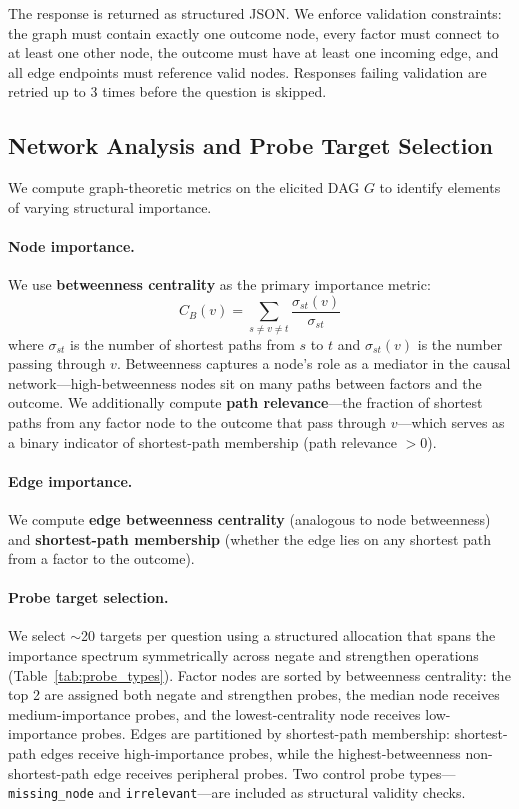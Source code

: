 \documentclass[11pt]{article}
\begin{document}
The response is returned as structured JSON. We enforce validation constraints: the graph must contain exactly one outcome node, every factor must connect to at least one other node, the outcome must have at least one incoming edge, and all edge endpoints must reference valid nodes. Responses failing validation are retried up to 3 times before the question is skipped.

\subsection{Network Analysis and Probe Target Selection}
\label{sec:network}

We compute graph-theoretic metrics on the elicited DAG $G$ to identify elements of varying structural importance.

\paragraph{Node importance.} We use \textbf{betweenness centrality} as the primary importance metric:
\begin{equation}
    C_B(v) = \sum_{s \neq v \neq t} \frac{\sigma_{st}(v)}{\sigma_{st}}
\end{equation}
where $\sigma_{st}$ is the number of shortest paths from $s$ to $t$ and $\sigma_{st}(v)$ is the number passing through $v$. Betweenness captures a node's role as a mediator in the causal network---high-betweenness nodes sit on many paths between factors and the outcome. We additionally compute \textbf{path relevance}---the fraction of shortest paths from any factor node to the outcome that pass through $v$---which serves as a binary indicator of shortest-path membership (path relevance $> 0$).

\paragraph{Edge importance.} We compute \textbf{edge betweenness centrality} (analogous to node betweenness) and \textbf{shortest-path membership} (whether the edge lies on any shortest path from a factor to the outcome).

\paragraph{Probe target selection.} We select ${\sim}$20 targets per question using a structured allocation that spans the importance spectrum symmetrically across negate and strengthen operations (Table~\ref{tab:probe_types}). Factor nodes are sorted by betweenness centrality: the top 2 are assigned both negate and strengthen probes, the median node receives medium-importance probes, and the lowest-centrality node receives low-importance probes. Edges are partitioned by shortest-path membership: shortest-path edges receive high-importance probes, while the highest-betweenness non-shortest-path edge receives peripheral probes. Two control probe types---\texttt{missing\_node} and \texttt{irrelevant}---are included as structural validity checks.
\end{document}
